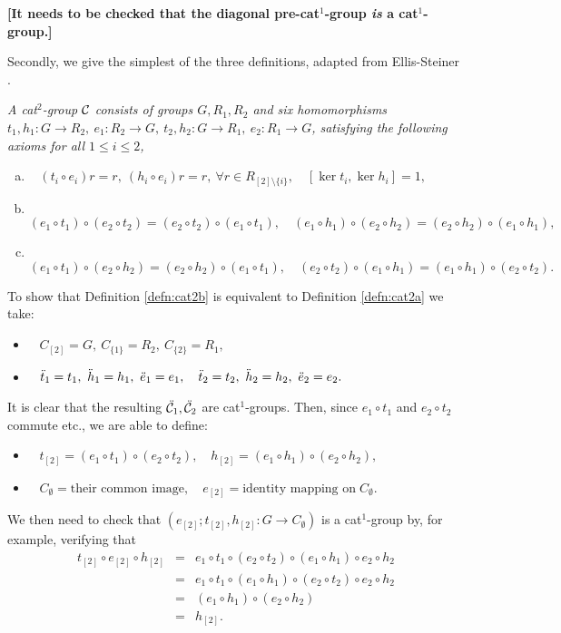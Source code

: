 \bigskip\noindent
{\bf [It needs to be checked that the diagonal pre-cat$^1$-group 
\emph{is} a cat$^1$-group.]}

\medskip 
Secondly, we give the simplest of the three definitions, 
adapted from Ellis-Steiner \cite{ell:st}. 
\begin{defn} \label{defn:cat2b} 
\emph{A cat$^2$-group  $\mathcal{C}$ consists of groups $G, R_1,R_2$ 
and six homomorphisms 
$t_1,h_1 : G \to R_2,~ e_1 : R_2 \to G,~
 t_2,h_2 : G \to R_1,~ e_2 : R_1 \to G$,  
satisfying the following axioms for all $1 \leqslant i \leqslant 2$,} 
\begin{enumerate}[(a)]
\item~
$
(t_i \circ e_i)r = r,~ (h_i \circ e_i)r = r,~ 
\forall r \in R_{[2] \setminus \{i\}}, \quad 
[\ker t_i, \ker h_i] = 1, 
$
\item~ 
$
(e_1 \circ t_1) \circ (e_2 \circ t_2) = (e_2 \circ t_2) \circ (e_1 \circ t_1), \quad
(e_1 \circ h_1) \circ (e_2 \circ h_2) = (e_2 \circ h_2) \circ (e_1 \circ h_1), 
$
\item~ 
$
(e_1 \circ t_1) \circ (e_2 \circ h_2) = (e_2 \circ h_2) \circ (e_1 \circ t_1), \quad 
(e_2 \circ t_2) \circ (e_1 \circ h_1) = (e_1 \circ h_1) \circ (e_2 \circ t_2). 
$
\end{enumerate}
\end{defn} 

To show that Definition \ref{defn:cat2b} is equivalent to 
Definition \ref{defn:cat2a} we take: 
\begin{itemize}
\item~ 
$
C_{[2]} = G,~  C_{\{1\}} = R_2,~ C_{\{2\}} = R_1, 
$
\item~ 
$
\ddot{t}_1 = t_1,~ \ddot{h}_1 = h_1,~ \ddot{e}_1 = e_1,\quad 
\ddot{t}_2 = t_2,~ \ddot{h}_2 = h_2,~ \ddot{e}_2 = e_2.
$
\end{itemize} 
It is clear that the resulting $\ddot{\mathcal{C}}_1, \ddot{\mathcal{C}}_2$ are cat$^1$-groups. 
Then, since $e_1 \circ t_1$ and $e_2 \circ t_2$ commute etc., 
we are able to define: 
\begin{itemize} 
\item~
$
t_{[2]} = (e_1 \circ t_1) \circ (e_2 \circ t_2),\quad 
h_{[2]} = (e_1 \circ h_1) \circ (e_2 \circ h_2), 
$
\item~ 
$
C_{\emptyset} = \mbox{their common image},\quad 
e_{[2]} = \mbox{identity mapping on}\; C_{\emptyset}. 
$
\end{itemize}
We then need to check that $(e_{[2]};t_{[2]},h_{[2]} : G \to C_{\emptyset})$ 
is a cat$^1$-group by, for example, verifying that 
\begin{eqnarray*} 
t_{[2]} \circ e_{[2]} \circ h_{[2]} 
  & = &  
e_1 \circ t_1 \circ (e_2 \circ t_2) \circ (e_1 \circ h_1) \circ e_2 \circ h_2 \\ 
  & = & 
e_1 \circ t_1 \circ (e_1 \circ h_1) \circ (e_2 \circ t_2) \circ e_2 \circ h_2 \\ 
  & = & 
(e_1 \circ h_1) \circ (e_2 \circ h_2) \\ 
  & = & 
h_{[2]}.
\end{eqnarray*} 

